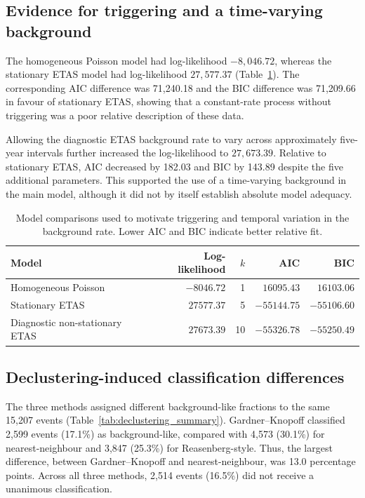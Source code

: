 \subsection{Evidence for triggering and a time-varying background}
\label{sec:results_nonstationarity}

The homogeneous Poisson model had log-likelihood $-8,046.72$, whereas the
stationary ETAS model had log-likelihood $27,577.37$ (Table~\ref{tab:model_comparison}).
The corresponding AIC difference was 71,240.18 and the BIC difference was
71,209.66 in favour of stationary ETAS, showing that a constant-rate process
without triggering was a poor relative description of these data.

Allowing the diagnostic ETAS background rate to vary across approximately
five-year intervals further increased the log-likelihood to $27,673.39$.
Relative to stationary ETAS, AIC decreased by 182.03 and BIC by 143.89 despite
the five additional parameters. This supported the use of a time-varying
background in the main model, although it did not by itself establish absolute
model adequacy.

\begin{table}[htbp]
\centering
\caption{Model comparisons used to motivate triggering and temporal variation
in the background rate. Lower AIC and BIC indicate better relative fit.}
\label{tab:model_comparison}
\begin{tabular}{lrrrr}
\toprule
Model & Log-likelihood & $k$ & AIC & BIC \\
\midrule
Homogeneous Poisson & $-8046.72$ & 1 & $16095.43$ & $16103.06$ \\
Stationary ETAS & $27577.37$ & 5 & $-55144.75$ & $-55106.60$ \\
Diagnostic non-stationary ETAS & $27673.39$ & 10 & $-55326.78$ & $-55250.49$ \\
\bottomrule
\end{tabular}
\end{table}

\subsection{Declustering-induced classification differences}
\label{sec:results_declustering}

The three methods assigned different background-like fractions to the same
15,207 events (Table~\ref{tab:declustering_summary}). Gardner--Knopoff
classified 2,599 events (17.1\%) as background-like, compared with 4,573
(30.1\%) for nearest-neighbour and 3,847 (25.3\%) for Reasenberg-style. Thus,
the largest difference, between Gardner--Knopoff and nearest-neighbour, was
13.0 percentage points. Across all three methods, 2,514 events (16.5\%) did
not receive a unanimous classification.

